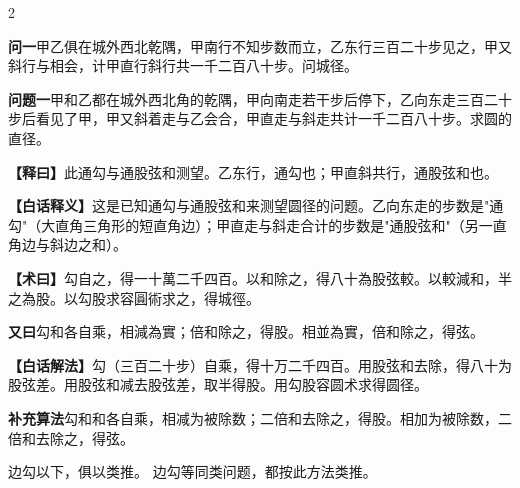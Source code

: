 \documentclass[11pt,a4paper]{article}
\newcommand{\WenQuestion}[1]{\textbf{\textcolor{classicalcolor}{#1}}}
\newcommand{\BaiQuestion}[1]{\textbf{\textcolor{moderncolor}{#1}}}
\newcommand{\WenExplain}{\textcolor{classicalcolor}{\textbf{【释曰】}}}
\newcommand{\BaiExplain}{\textcolor{moderncolor}{\textbf{【白话释义】}}}
\newcommand{\WenMethod}{\textcolor{classicalcolor}{\textbf{【术曰】}}}
\newcommand{\BaiMethod}{\textcolor{moderncolor}{\textbf{【白话解法】}}}
\begin{document}
\begin{paracol}{2}

\switchcolumn*
\begin{tcolorbox}[colback=red!3,colframe=red!30!black,boxrule=0.3pt]
\WenQuestion{问一}\quad 甲乙俱在城外西北乾隅，甲南行不知步数而立，乙东行三百二十步见之，甲又斜行与相会，计甲直行斜行共一千二百八十步。问城径。
\end{tcolorbox}
\switchcolumn
\begin{tcolorbox}[colback=blue!3,colframe=blue!30!black,boxrule=0.3pt]
\BaiQuestion{问题一}\quad 甲和乙都在城外西北角的乾隅，甲向南走若干步后停下，乙向东走三百二十步后看见了甲，甲又斜着走与乙会合，甲直走与斜走共计一千二百八十步。求圆的直径。
\end{tcolorbox}

\switchcolumn*
\begin{tcolorbox}[colback=red!5,colframe=red!30!black,boxrule=0.3pt]
\WenExplain\quad 此通勾与通股弦和测望。乙东行，通勾也；甲直斜共行，通股弦和也。
\end{tcolorbox}
\switchcolumn
\begin{tcolorbox}[colback=blue!5,colframe=blue!30!black,boxrule=0.3pt]
\BaiExplain\quad 这是已知通勾与通股弦和来测望圆径的问题。乙向东走的步数是"通勾"（大直角三角形的短直角边）；甲直走与斜走合计的步数是"通股弦和"（另一直角边与斜边之和）。
\end{tcolorbox}

\switchcolumn*
\begin{tcolorbox}[colback=red!5,colframe=red!40!black,boxrule=0.3pt]
\WenMethod\quad 勾自之，得一十萬二千四百。以和除之，得八十為股弦較。以較減和，半之為股。以勾股求容圓術求之，得城徑。

\vspace{0.3em}
\textbf{又曰}\quad 勾和各自乘，相減為實；倍和除之，得股。相並為實，倍和除之，得弦。
\end{tcolorbox}
\switchcolumn
\begin{tcolorbox}[colback=blue!5,colframe=blue!40!black,boxrule=0.3pt]
\BaiMethod\quad 勾（三百二十步）自乘，得十万二千四百。用股弦和去除，得八十为股弦差。用股弦和减去股弦差，取半得股。用勾股容圆术求得圆径。

\vspace{0.3em}
\textbf{补充算法}\quad 勾和和各自乘，相减为被除数；二倍和去除之，得股。相加为被除数，二倍和去除之，得弦。
\end{tcolorbox}

\switchcolumn*
\vspace{0.3em}
\noindent\small 边勾以下，俱以类推。
\switchcolumn
\vspace{0.3em}
\noindent\small 边勾等同类问题，都按此方法类推。


\end{paracol}
\end{document}
